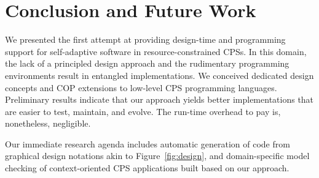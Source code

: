 \section{Conclusion and Future Work}
\label{sec:ending}

We presented the first attempt at providing design-time and
programming support for self-adaptive software in re\-sour\-ce-constrained
CPSs. In this domain, the lack of a principled design approach and the
rudimentary programming environments result in entangled
implementations. We conceived dedicated design concepts and COP
extensions to low-level CPS programming languages. Preliminary results
indicate that our approach yields better implementations
that are easier to test, maintain, and evolve. The run-time overhead
to pay is, nonetheless, negligible.

Our immediate research agenda includes automatic generation of \conesc
code from graphical design notations akin to Figure~\ref{fig:design},
and domain-specific model checking of context-oriented CPS
applications built based on our approach.

